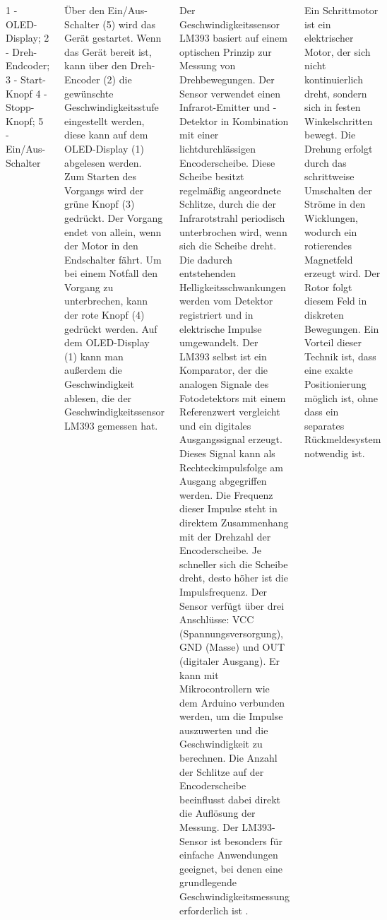 \documentclass[25pt,a0paper, portrait]{tikzposter}
\begin{document}
\begin{columns}
{{			1 - OLED-Display; 2 - Dreh-Endcoder; 3 - Start-Knopf
			4 - Stopp-Knopf; 5 - Ein/Aus-Schalter
		}
		
		{
			Über den Ein/Aus-Schalter (5) wird das Gerät gestartet. Wenn das Gerät bereit ist, kann über den Dreh-Encoder (2) die gewünschte Geschwindigkeitsstufe eingestellt werden, diese kann auf dem OLED-Display (1) abgelesen werden. Zum Starten des Vorgangs wird der grüne Knopf (3) gedrückt. Der Vorgang endet von allein, wenn der Motor in den Endschalter fährt. Um bei einem Notfall den Vorgang zu unterbrechen, kann der rote Knopf (4) gedrückt werden. Auf dem OLED-Display (1) kann man außerdem die Geschwindigkeit ablesen, die der Geschwindigkeitssensor LM393 gemessen hat.
		}
			
		{
			Der Geschwindigkeitssensor LM393 basiert auf einem optischen Prinzip zur Messung von Drehbewegungen. Der Sensor verwendet einen Infrarot-Emitter und -Detektor in Kombination mit einer lichtdurchlässigen Encoderscheibe. Diese Scheibe besitzt regelmäßig angeordnete Schlitze, durch die der Infrarotstrahl periodisch unterbrochen wird, wenn sich die Scheibe dreht. Die dadurch entstehenden Helligkeitsschwankungen werden vom Detektor registriert und in elektrische Impulse umgewandelt.
			Der LM393 selbst ist ein Komparator, der die analogen Signale des Fotodetektors mit einem Referenzwert vergleicht und ein digitales Ausgangssignal erzeugt. Dieses Signal kann als Rechteckimpulsfolge am Ausgang abgegriffen werden. Die Frequenz dieser Impulse steht in direktem Zusammenhang mit der Drehzahl der Encoderscheibe. Je schneller sich die Scheibe dreht, desto höher ist die Impulsfrequenz.
			Der Sensor verfügt über drei Anschlüsse: VCC (Spannungsversorgung), GND (Masse) und OUT (digitaler Ausgang). Er kann mit Mikrocontrollern wie dem Arduino verbunden werden, um die Impulse auszuwerten und die Geschwindigkeit zu berechnen. Die Anzahl der Schlitze auf der Encoderscheibe beeinflusst dabei direkt die Auflösung der Messung. Der LM393-Sensor ist besonders für einfache Anwendungen geeignet, bei denen eine grundlegende Geschwindigkeitsmessung erforderlich ist
			.
		}
		
			{
				Ein Schrittmotor ist ein elektrischer Motor, der sich nicht kontinuierlich dreht, sondern sich in festen Winkelschritten bewegt. Die Drehung erfolgt durch das schrittweise Umschalten der Ströme in den Wicklungen, wodurch ein rotierendes Magnetfeld erzeugt wird. Der Rotor folgt diesem Feld in diskreten Bewegungen. Ein Vorteil dieser Technik ist, dass eine exakte Positionierung möglich ist, ohne dass ein separates Rückmeldesystem notwendig ist.
				
}}
\end{columns}
\end{document}
